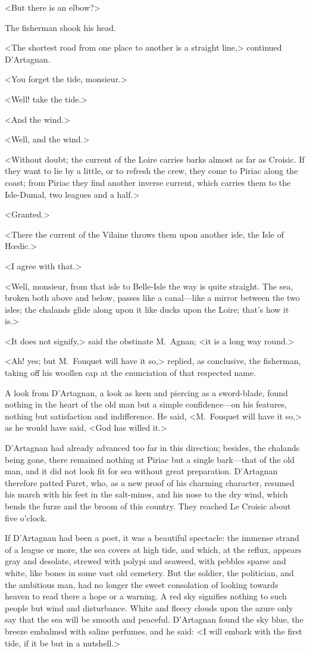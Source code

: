 <But there is an elbow?>

The fisherman shook his head.

<The shortest road from one place to another is a straight line,> continued D'Artagnan.

<You forget the tide, monsieur.>

<Well! take the tide.>

<And the wind.>

<Well, and the wind.>

<Without doubt; the current of the Loire carries barks almost as far as Croisic. If they want to lie by a little, or to refresh the crew, they come to Piriac along the coast; from Piriac they find another inverse current, which carries them to the Isle-Dumal, two leagues and a half.>

<Granted.>

<There the current of the Vilaine throws them upon another isle, the Isle of Hœdic.>

<I agree with that.>

<Well, monsieur, from that isle to Belle-Isle the way is quite straight. The sea, broken both above and below, passes like a canal—like a mirror between the two isles; the chalands glide along upon it like ducks upon the Loire; that's how it is.>

<It does not signify,> said the obstinate M.~Agnan; <it is a long way round.>

<Ah! yes; but M.~Fouquet will have it so,> replied, as conclusive, the fisherman, taking off his woollen cap at the enunciation of that respected name.

A look from D'Artagnan, a look as keen and piercing as a sword-blade, found nothing in the heart of the old man but a simple confidence—on his features, nothing but satisfaction and indifference. He said, <M.~Fouquet will have it so,> as he would have said, <God has willed it.>

D'Artagnan had already advanced too far in this direction; besides, the chalands being gone, there remained nothing at Piriac but a single bark—that of the old man, and it did not look fit for sea without great preparation. D'Artagnan therefore patted Furet, who, as a new proof of his charming character, resumed his march with his feet in the salt-mines, and his nose to the dry wind, which bends the furze and the broom of this country. They reached Le Croisic about five o'clock.

If D'Artagnan had been a poet, it was a beautiful spectacle: the immense strand of a league or more, the sea covers at high tide, and which, at the reflux, appears gray and desolate, strewed with polypi and seaweed, with pebbles sparse and white, like bones in some vast old cemetery. But the soldier, the politician, and the ambitious man, had no longer the sweet consolation of looking towards heaven to read there a hope or a warning. A red sky signifies nothing to such people but wind and disturbance. White and fleecy clouds upon the azure only say that the sea will be smooth and peaceful. D'Artagnan found the sky blue, the breeze embalmed with saline perfumes, and he said: <I will embark with the first tide, if it be but in a nutshell.>

